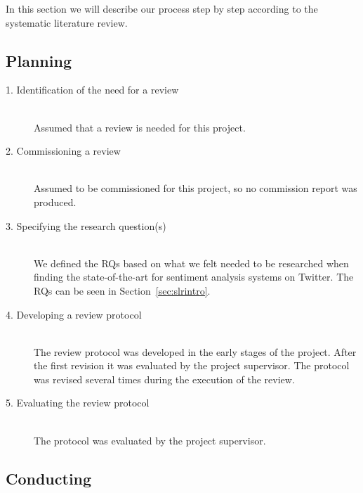 In this section we will describe our process step by step according to the systematic literature review. 

\subsection{Planning}

\begin{description}

	\item[1. Identification of the need for a review] \hfill \\
		Assumed that a review is needed for this project. 
		
	\item[2. Commissioning a review] \hfill \\
		Assumed to be commissioned for this project, so no commission report was produced. 

	\item[3. Specifying the research question(s)] \hfill \\
		We defined the RQs based on what we felt needed to be researched when finding the state-of-the-art for sentiment analysis systems on Twitter. The RQs can be seen in Section~\ref{sec:slrintro}. 

	\item[4. Developing a review protocol] \hfill \\
		The review protocol was developed in the early stages of the project. After the first revision it was evaluated by the project supervisor. The protocol was revised several times during the execution of the review.
	

	\item[5. Evaluating the review protocol] \hfill \\
		The protocol was evaluated by the project supervisor. 

\end{description}


\subsection{Conducting}

